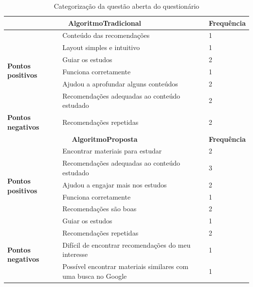\begin{table}[h]
\footnotesize
\caption{Categorização da questão aberta do questionário}
\label{ref:categorizacao-questao-aberta}
\centering
\begin{tabular}{|p{3cm}|p{10cm}|p{2cm}|}
\hline
\multicolumn{2}{|c|}{\textbf{AlgoritmoTradicional}}                                           & \textbf{Frequência} \\
\hline
\multirow{6}{*}{\textbf{Pontos positivos}} & Conteúdo das recomendações                                     & 1          \\
                          & Layout simples e intuitivo                                     & 1          \\
                          & Guiar os estudos                                               & 2          \\
                          & Funciona corretamente                                          & 1          \\
                          & Ajudou a aprofundar alguns conteúdos                           & 2          \\
                          & Recomendações adequadas ao conteúdo estudado                   & 2          \\
\hline
\textbf{Pontos negativos} & Recomendações repetidas                                        & 2          \\
\hline
\multicolumn{2}{|c|}{\textbf{AlgoritmoProposta}}                                              & \textbf{Frequência} \\
\hline
\multirow{6}{*}{\textbf{Pontos positivos}} & Encontrar materiais para estudar                               & 2          \\
                          & Recomendações adequadas ao conteúdo estudado                   & 3          \\
                          & Ajudou a engajar mais nos estudos                              & 2          \\
                          & Funciona corretamente                                          & 1          \\
                          & Recomendações são boas                                         & 2          \\
                          & Guiar os estudos                                               & 1          \\
\hline
\multirow{3}{*}{\textbf{Pontos negativos}} & Recomendações repetidas                                        & 2          \\
                          & Difícil de encontrar recomendações do meu interesse            & 1          \\
                          & Possível encontrar materiais similares com uma busca no Google & 1          \\
\hline
\end{tabular}
\end{table}

